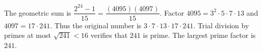 The geometric sum is $\dfrac{2^{24}-1}{15}=\dfrac{(4095)(4097)}{15}$. Factor $4095=3^2\cdot5\cdot7\cdot13$ and $4097=17\cdot241$. Thus the original number is $3\cdot7\cdot13\cdot17\cdot241$. Trial division by primes at most $\sqrt{241}<16$ verifies that $241$ is prime. The largest prime factor is $\boxed{241}$.
